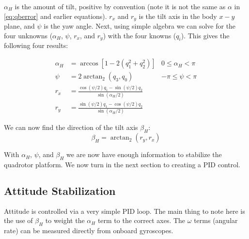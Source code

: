 \documentclass{article}
\numberwithin{equation}{section} %
\begin{document}
$\alpha_H$ is the amount of tilt, positive by convention (note it is not the same as $\alpha$ in \ref{eq:qberror} and earlier equations). $r_x$ and $r_y$ is the tilt axis in the body $x-y$ plane, and $\psi$ is the yaw angle. Next, using simple algebra we can solve for the four unknowns ($\alpha_H$, $\psi$, $r_x$, and $r_y$) with the four knowns ($q_i$). This gives the following four results:

\begin{align}
	\alpha_H &= \arccos \left[1 - 2 \left( q_1^2 + q_2^2 \right) \right]	&0 \leq \alpha_H < \pi \\
	\psi &= 2 \arctan_2 \left( q_3, q_0 \right) &-\pi \leq \psi < \pi \\
	r_x &=   \frac{\cos \left( \psi / 2 \right) q_1 - \sin \left( \psi / 2 \right) q_2}
	{ \sin \left( \alpha_H / 2 \right) } &\\
	r_y &=   \frac{\sin \left( \psi / 2 \right) q_1 - \cos \left( \psi / 2 \right) q_2}
	{ \sin \left( \alpha_H / 2 \right) } &
\end{align}

We can now find the direction of the tilt axis $\beta_H$:
\begin{equation}
	\beta_H = \arctan_2 \left(r_y, r_x \right)
\end{equation}

With $\alpha_H$, $\psi$, and $\beta_H$ we are now have enough information to stabilize the quadrotor platform. We now turn in the next section to creating a PID control.



\subsection{Attitude Stabilization} \label{subsec:attitudestabilization}

Attitude is controlled via a very simple PID loop. The main thing to note here is the use of $\beta_H$ to weight the $\alpha_H$ term to the correct axes. The $\omega$ terms (angular rate) can be measured directly from onboard gyroscopes.
\end{document}
